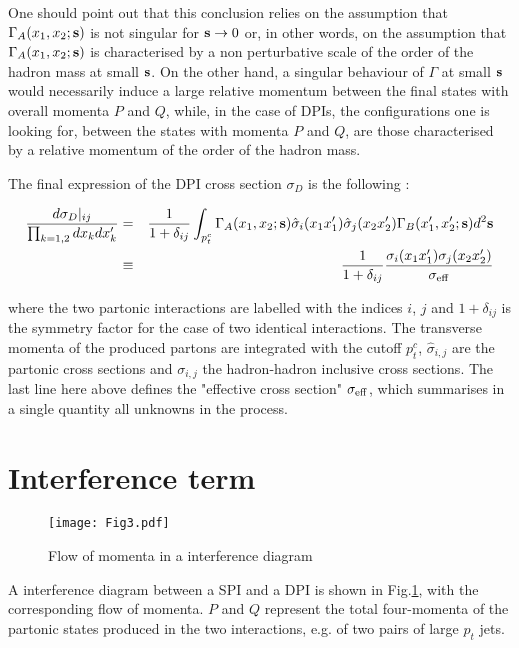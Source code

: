 \documentclass{ws-rv9x6}
\begin{document}
One should point out that this conclusion relies on the assumption that $\Gamma_A(x_1,x_2;{\bf s})$ is not singular for ${\bf s}\to0$ or, in other words, on the assumption that $\Gamma_A(x_1,x_2;{\bf s})$ is characterised by a non perturbative scale of the order of the hadron mass at small ${\bf s}$. On the other hand, a singular behaviour of $\Gamma$ at small ${\bf s}$ would necessarily induce a large relative momentum between the final states with overall momenta $P$ and $Q$, while, in the case of DPIs, the configurations one is looking for, between the states with momenta $P$ and $Q$, are those characterised by a relative momentum of the order of the hadron mass. 

The final expression of the DPI cross section $\sigma_D$ is the following\cite{Paver:1982yp} : 

\begin{eqnarray}\label{double scattering}
\frac{d\sigma_D|_{ij}}{\prod_{k=1,2}dx_kdx_k'}&=&\frac{1}{1+\delta_{ij}}\int_{p_t^c}\Gamma_A(x_1,x_2;{\bf s})\hat\sigma_i(x_1x_1')\hat\sigma_j(x_2x_2')\Gamma_B(x_1',x_2';{\bf s})d^2{\bf s}\cr
&\equiv&\frac{1}{1+\delta_{ij}}\frac{\sigma_i(x_1x_1')\sigma_j(x_2x_2')}{\sigma_{\rm eff}}
\end{eqnarray}

\noindent
where the two partonic interactions are labelled with the indices $i$, $j$ and $1+\delta_{ij}$ is the symmetry factor for the case of two identical interactions. The transverse momenta of the produced partons are integrated with the cutoff ${p_t^c}$, $\hat{\sigma}_{i,j}$ are the partonic cross sections and $\sigma_{i,j}$ the hadron-hadron inclusive cross sections. The last line here above defines the "effective cross section" $\sigma_{\rm eff}$, which summarises in a single quantity all unknowns in the process.

\section{Interference term}

\begin{figure}[htp]
\centering
\texttt{[image: Fig3.pdf]}
\vspace{0cm}
\caption{Flow of momenta in a interference diagram}
\label{fig:transverse_interference}
\end{figure}

A interference diagram between a SPI and a DPI is shown in Fig.\ref{fig:transverse_interference}, with the corresponding flow of momenta. $P$ and $Q$ represent the total four-momenta of the partonic states produced in the two interactions, e.g. of two pairs of large $p_t$ jets.
\end{document}
